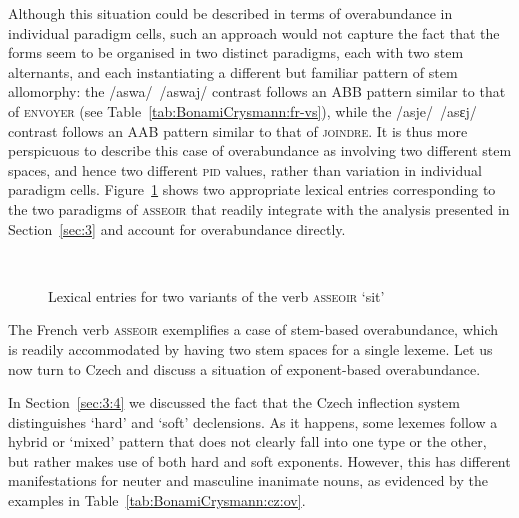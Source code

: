 \documentclass[output=paper]{langsci/langscibook}
\begin{document}
Although this situation could be described in terms of overabundance
in individual paradigm cells, such an approach would not capture the
fact that the forms seem to be organised in two distinct paradigms,
each with two stem alternants, and each instantiating a different but
familiar pattern of stem allomorphy: the /aswa/~/aswaj/ contrast
follows an ABB pattern similar to that of \textsc{envoyer} (see
Table~\ref{tab:BonamiCrysmann:fr-vs}), while the /asje/~/asɛj/ contrast follows an AAB
pattern similar to that of \textsc{joindre}. It is thus more
perspicuous to describe this case of overabundance as involving two
different stem spaces, and hence two different \textsc{pid} values,
rather than variation in individual paradigm
cells. Figure~\ref{fig:BonamiCrysmann:asseoir:LE} shows two appropriate lexical
entries corresponding to the two paradigms of \textsc{asseoir} that
readily integrate with the analysis presented in Section~\ref{sec:3} and account
for overabundance directly.

\begin{figure}[htb]
\smaller\centering
{}
~~~
\caption{Lexical entries for two variants of the verb \textsc{asseoir}
  `sit'\label{fig:BonamiCrysmann:asseoir:LE}}
\end{figure}

The French verb \textsc{asseoir} exemplifies a case of stem-based
overabundance, which is readily accommodated by having two stem spaces
for a single lexeme.   Let us now turn to Czech and discuss a situation
of exponent-based overabundance.

In Section~\ref{sec:3:4} we discussed the fact that the Czech inflection system
distinguishes `hard' and `soft' declensions. As it happens, some
lexemes follow a hybrid or `mixed' pattern that does not clearly fall
into one type or the other, but rather makes use of both hard and soft
exponents. However, this has different manifestations for neuter and
masculine inanimate nouns, as evidenced by the examples in
Table~\ref{tab:BonamiCrysmann:cz:ov}.
\end{document}
